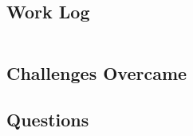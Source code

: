 \documentclass[letterpaper,10pt,fleqn]{article}
\numberwithin{equation}{section}
\begin{document}
\subsection*{Work Log}
\begin{verbatim}
\end{verbatim}

\subsection*{Challenges Overcame}
\begin{itemize}
\end{itemize}

\subsection*{Questions}
\begin{enumerate}
\end{enumerate}
\end{document}
